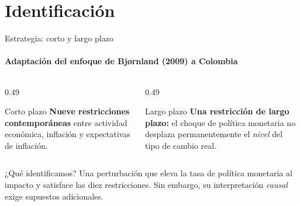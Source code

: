 \documentclass{beamer}
\begin{document}

\section{Identificación}

\begin{frame}{Estrategia: corto y largo plazo}
 \framesubtitle{Adaptación del enfoque de Bj{\o}rnland (2009) a Colombia}
 \begin{columns}[T]
  \begin{column}{0.49\textwidth}
   \begin{block}{Corto plazo}
    \small
    \textbf{Nueve restricciones contemporáneas} entre actividad económica,
    inflación y expectativas de inflación.\\
   \end{block}
  \end{column}
  \begin{column}{0.49\textwidth}
   \begin{block}{Largo plazo}
    \small
    \textbf{Una restricción de largo plazo:} el choque de política monetaria no desplaza
    permanentemente el \emph{nivel} del tipo de cambio real.\\
   \end{block}
  \end{column}
 \end{columns}
 \vfill
 \begin{alertblock}{¿Qué identificamos?}
  \small Una perturbación que eleva la tasa de política monetaria al impacto y satisface las diez
  restricciones. Sin embargo, su interpretación \emph{causal} exige supuestos adicionales.
 \end{alertblock}
\end{frame}
\end{document}
